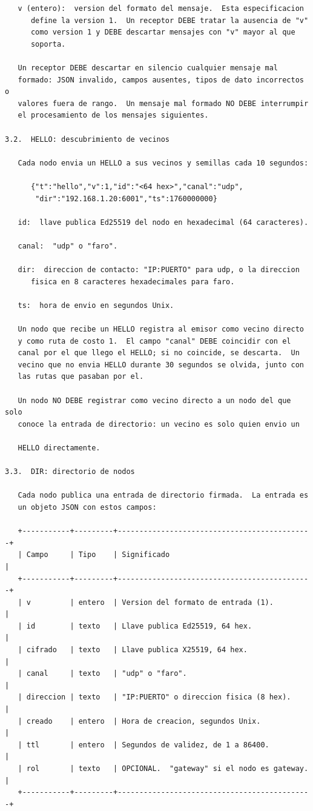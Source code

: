 \newpage
\begin{Verbatim}
   v (entero):  version del formato del mensaje.  Esta especificacion
      define la version 1.  Un receptor DEBE tratar la ausencia de "v"
      como version 1 y DEBE descartar mensajes con "v" mayor al que
      soporta.

   Un receptor DEBE descartar en silencio cualquier mensaje mal
   formado: JSON invalido, campos ausentes, tipos de dato incorrectos o
   valores fuera de rango.  Un mensaje mal formado NO DEBE interrumpir
   el procesamiento de los mensajes siguientes.

3.2.  HELLO: descubrimiento de vecinos

   Cada nodo envia un HELLO a sus vecinos y semillas cada 10 segundos:

      {"t":"hello","v":1,"id":"<64 hex>","canal":"udp",
       "dir":"192.168.1.20:6001","ts":1760000000}

   id:  llave publica Ed25519 del nodo en hexadecimal (64 caracteres).

   canal:  "udp" o "faro".

   dir:  direccion de contacto: "IP:PUERTO" para udp, o la direccion
      fisica en 8 caracteres hexadecimales para faro.

   ts:  hora de envio en segundos Unix.

   Un nodo que recibe un HELLO registra al emisor como vecino directo
   y como ruta de costo 1.  El campo "canal" DEBE coincidir con el
   canal por el que llego el HELLO; si no coincide, se descarta.  Un
   vecino que no envia HELLO durante 30 segundos se olvida, junto con
   las rutas que pasaban por el.

   Un nodo NO DEBE registrar como vecino directo a un nodo del que solo
   conoce la entrada de directorio: un vecino es solo quien envio un

   HELLO directamente.

3.3.  DIR: directorio de nodos

   Cada nodo publica una entrada de directorio firmada.  La entrada es
   un objeto JSON con estos campos:

   +-----------+---------+---------------------------------------------+
   | Campo     | Tipo    | Significado                                 |
   +-----------+---------+---------------------------------------------+
   | v         | entero  | Version del formato de entrada (1).         |
   | id        | texto   | Llave publica Ed25519, 64 hex.              |
   | cifrado   | texto   | Llave publica X25519, 64 hex.               |
   | canal     | texto   | "udp" o "faro".                             |
   | direccion | texto   | "IP:PUERTO" o direccion fisica (8 hex).     |
   | creado    | entero  | Hora de creacion, segundos Unix.            |
   | ttl       | entero  | Segundos de validez, de 1 a 86400.          |
   | rol       | texto   | OPCIONAL.  "gateway" si el nodo es gateway. |
   +-----------+---------+---------------------------------------------+
\end{Verbatim}
